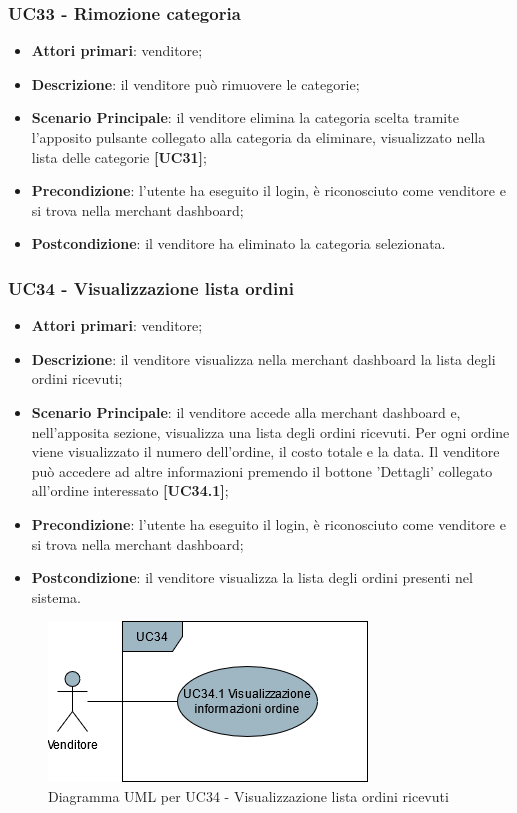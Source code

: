 \subsubsection{UC33 - Rimozione categoria}
\begin{itemize}
\item \textbf{Attori primari}: venditore;
\item \textbf{Descrizione}: il venditore può rimuovere le categorie;
\item \textbf{Scenario Principale}: il venditore elimina la categoria scelta tramite l'apposito pulsante collegato alla categoria da eliminare, visualizzato nella lista delle categorie \textbf{[UC31]};
\item \textbf{Precondizione}: l'utente ha eseguito il login, è riconosciuto come venditore e si trova nella merchant dashboard;
\item \textbf{Postcondizione}: il venditore ha eliminato la categoria selezionata.
\end{itemize}


\subsubsection{UC34 - Visualizzazione lista ordini}
\begin{itemize}
\item \textbf{Attori primari}: venditore;
\item \textbf{Descrizione}: il venditore visualizza nella merchant dashboard la lista degli ordini ricevuti;
\item \textbf{Scenario Principale}: il venditore accede alla merchant dashboard e, nell'apposita sezione, visualizza una lista degli ordini ricevuti. Per ogni ordine viene visualizzato il numero dell'ordine, il costo totale e la data. Il venditore può accedere ad altre informazioni premendo il bottone 'Dettagli' collegato all'ordine interessato \textbf{[UC34.1]};
\item \textbf{Precondizione}: l'utente ha eseguito il login, è riconosciuto come venditore e si trova nella merchant dashboard;
\item \textbf{Postcondizione}: il venditore visualizza la lista degli ordini presenti nel sistema.
\end{itemize}

\begin{figure}[H]
\centering
\includegraphics[scale=0.6]{res/UseCase/Immagini/VisualizzazioneOrdiniMerchant}
\caption{Diagramma UML per UC34 - Visualizzazione lista ordini ricevuti}
\end{figure}

